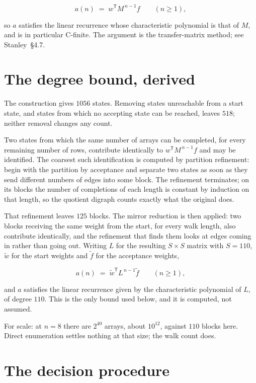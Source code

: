 \documentclass[11pt]{article}
\theoremstyle{definition}
\begin{document}
\[a(n) \;=\; w^{\mathsf T} M^{\,n-1} f \qquad (n \ge 1),\]

so $a$ satisfies the linear recurrence whose characteristic polynomial is that of $M$, and is in particular C-finite. The argument is the transfer-matrix method; see Stanley~\S4.7.

\section{The degree bound, derived}

The construction gives $1056$ states. Removing states unreachable from a start state, and states from which no accepting state can be reached, leaves $518$; neither removal changes any count.

Two states from which the same number of arrays can be completed, for every remaining number of rows, contribute identically to $w^{\mathsf T}M^{\,n-1}f$ and may be identified. The coarsest such identification is computed by partition refinement: begin with the partition by acceptance and separate two states as soon as they send different numbers of edges into some block. The refinement terminates; on its blocks the number of completions of each length is constant by induction on that length, so the quotient digraph counts exactly what the original does.

That refinement leaves $125$ blocks. The mirror reduction is then applied: two blocks receiving the same weight from the start, for every walk length, also contribute identically, and the refinement that finds them looks at edges coming in rather than going out. Writing $L$ for the resulting $S \times S$ matrix with $S = 110$, $\tilde w$ for the start weights and $\tilde f$ for the acceptance weights,

\[a(n) \;=\; \tilde w^{\mathsf T} L^{\,n-1} \tilde f \qquad (n \ge 1),\]

and $a$ satisfies the linear recurrence given by the characteristic polynomial of $L$, of degree $110$. This is the only bound used below, and it is computed, not assumed.

For scale: at $n = 8$ there are $2^{40}$ arrays, about $10^{12}$, against $110$ blocks here. Direct enumeration settles nothing at that size; the walk count does.

\section{The decision procedure}
\end{document}
